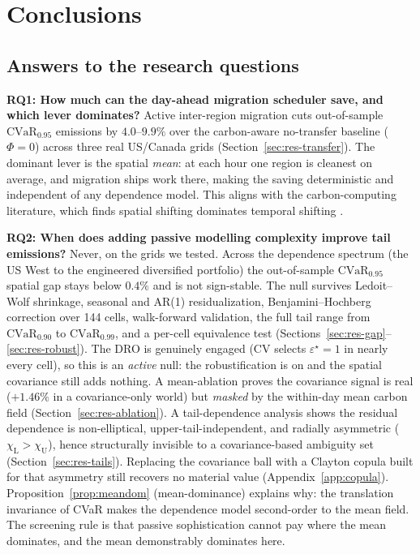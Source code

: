 \documentclass[10pt,twocolumn]{article}
\newcommand{\CVaR}{\mathrm{CVaR}}
\newcommand{\chiU}{\chi_{\mathrm{U}}}
\newcommand{\chiL}{\chi_{\mathrm{L}}}
\begin{document}
\section{Conclusions}\label{sec:conclusion}

\subsection{Answers to the research questions}
\textbf{RQ1: How much can the day-ahead migration scheduler save, and which lever
dominates?} Active inter-region migration cuts out-of-sample $\CVaR_{0.95}$ emissions
by $4.0$--$9.9\%$ over the
carbon-aware no-transfer baseline ($\Phi=0$) across three real US/Canada grids
(Section~\ref{sec:res-transfer}). The dominant lever is the spatial \emph{mean}: at
each hour one region is cleanest on average, and migration ships work there, making
the saving deterministic and independent of any dependence model. This aligns with
the carbon-computing literature, which finds spatial shifting dominates temporal
shifting \citep{wiesner2021,radovanovic2022}.

\textbf{RQ2: When does adding passive modelling complexity improve tail emissions?}
Never, on the grids we tested. Across the dependence spectrum (the US West to the
engineered diversified portfolio) the out-of-sample $\CVaR_{0.95}$ spatial gap stays
below $0.4\%$ and is not sign-stable. The null survives Ledoit--Wolf shrinkage,
seasonal and AR(1) residualization, Benjamini--Hochberg correction over 144 cells,
walk-forward validation, the full tail range from $\CVaR_{0.90}$ to $\CVaR_{0.99}$,
and a per-cell equivalence test (Sections~\ref{sec:res-gap}--\ref{sec:res-robust}).
The DRO is genuinely engaged (CV selects $\varepsilon^\star=1$ in nearly every cell),
so this is an \emph{active} null: the robustification is on and the spatial covariance
still adds nothing. A mean-ablation proves the covariance signal is real ($+1.46\%$ in
a covariance-only world) but \emph{masked} by the within-day mean carbon field
(Section~\ref{sec:res-ablation}). A tail-dependence analysis shows the residual
dependence is non-elliptical, upper-tail-independent, and radially asymmetric
($\chiL>\chiU$), hence structurally invisible to a covariance-based ambiguity set
(Section~\ref{sec:res-tails}). Replacing the covariance ball with a Clayton copula
built for that asymmetry still recovers no material value (Appendix~\ref{app:copula}).
Proposition~\ref{prop:meandom} (mean-dominance) explains why: the translation
invariance of CVaR makes the dependence model second-order to the mean field. The
screening rule is that passive sophistication cannot pay where the mean dominates, and
the mean demonstrably dominates here.
\end{document}
